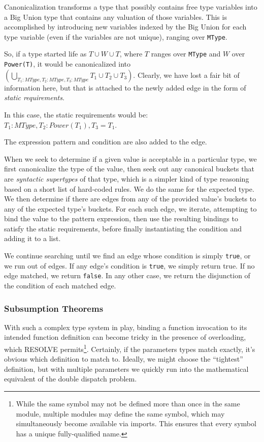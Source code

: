 Canonicalization transforms a type that possibly contains free type variables into a Big Union type that contains any valuation of those variables.  This is accomplished by introducing new variables indexed by the Big Union for each type variable (even if the variables are not unique), ranging over \texttt{MType}.

So, if a type started life as $T \cup W \cup T$, where $T$ ranges over \texttt{MType} and $W$ over \texttt{Power(T)}, it would be canonicalized into $\left( \bigcup \limits_{T_1 : MType, T_2 : MType, T_3 : MType} T_1 \cup T_2 \cup T_3 \right)$.  Clearly, we have lost a fair bit of information here, but that is attached to the newly added edge in the form of \emph{static requirements}.

In this case, the static requirements would be: $T_1 : MType, T_2 : Power(T_1), T_3 = T_1$.

The expression pattern and condition are also added to the edge.

When we seek to determine if a given value is acceptable in a particular type, we first canonicalize the type of the value, then seek out any canonical buckets that are \emph{syntactic supertypes} of that type, which is a simpler kind of type reasoning based on a short list of hard-coded rules.  We do the same for the expected type.  We then determine if there are edges from any of the provided value's buckets to any of the expected type's buckets.  For each such edge, we iterate, attempting to bind the value to the pattern expression, then use the resulting bindings to satisfy the static requirements, before finally instantiating the condition and adding it to a list.

We continue searching until we find an edge whose condition is simply \texttt{true}, or we run out of edges.  If any edge's condition is \texttt{true}, we simply return true.  If no edge matched, we return \texttt{false}.  In any other case, we return the disjunction of the condition of each matched edge.

		\subsubsection{Subsumption Theorems\label{subsumptionTheorems}}

With such a complex type system in play, binding a function invocation to its intended function definition can become tricky in the presence of overloading, which RESOLVE permits\footnote{While the same symbol may not be defined more than once in the same module, multiple modules may define the same symbol, which may simultaneously become available via imports.  This ensures that every symbol has a unique fully-qualified name.}.  Certainly, if the parameters types match exactly, it's obvious which definition to match to.  Ideally, we might choose the ``tightest'' definition, but with multiple parameters we quickly run into the mathematical equivalent of the double dispatch problem.


